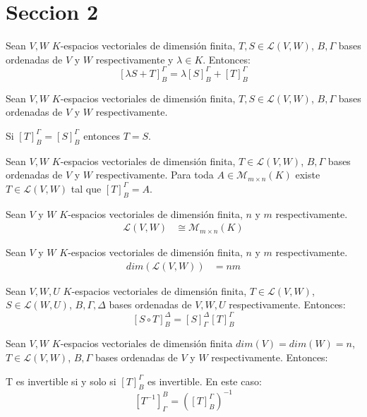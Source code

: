 \section{Seccion 2}
\begin{proposition}{}{}
    Sean $V, W$ $K$-espacios vectoriales de dimensión finita, $T, S \in \mathcal{L}(V,W)$, $B, \Gamma$ bases ordenadas de $V$ y $W$ respectivamente y $\lambda \in K$. Entonces:
    $$[\lambda S + T]_B^\Gamma = \lambda[S]_B^\Gamma + [T]_B^\Gamma$$
\end{proposition}
\begin{proposition}{}{}
    Sean $V, W$ $K$-espacios vectoriales de dimensión finita, $T, S \in \mathcal{L}(V,W)$, $B, \Gamma$ bases ordenadas de $V$ y $W$ respectivamente.

    Si $[T]_B^\Gamma = [S]_B^\Gamma$ entonces $T = S$.
\end{proposition}
\begin{proposition}{}{}
    Sean $V, W$ $K$-espacios vectoriales de dimensión finita, $T \in \mathcal{L}(V,W)$, $B, \Gamma$ bases ordenadas de $V$ y $W$ respectivamente. 
    Para toda $A \in \mathcal{M}_{m \times n}(K)$ existe $T \in \mathcal{L}(V,W)$ tal que $[T]_B^\Gamma = A$.
\end{proposition}
\begin{theorem}{}{}
    Sean $V$ y $W$ $K$-espacios vectoriales de dimensión finita, $n$ y $m$ respectivamente.
    \begin{align*}
        \mathcal{L}(V,W) &\cong \mathcal{M}_{m \times n}(K)
    \end{align*}
\end{theorem}
\begin{corollary}{}{}
    Sean $V$ y $W$ $K$-espacios vectoriales de dimensión finita, $n$ y $m$ respectivamente.
    \begin{align*}
        dim (\mathcal{L}(V, W)) &= nm
    \end{align*}
\end{corollary}
\begin{proposition}{}{}
    Sean $V, W, U$ $K$-espacios vectoriales de dimensión finita, $T \in \mathcal{L}(V,W)$, $S \in \mathcal{L}(W,U)$, $B, \Gamma, \Delta$ bases ordenadas de $V, W, U$ respectivamente. Entonces:
    $$[S \circ T]_B^\Delta = [S]_\Gamma^\Delta [T]_B^\Gamma$$
\end{proposition}
\begin{corollary}{}{}
    Sean $V, W$ $K$-espacios vectoriales de dimensión finita $dim(V) = dim(W) = n$, $T \in \mathcal{L}(V,W)$, $B, \Gamma$ bases ordenadas de $V$ y $W$ respectivamente. Entonces:

    T es invertible si y solo si $[T]_B^\Gamma$ es invertible. En este caso:
    $$[T^{-1}]_\Gamma^B = \left(\left[T\right]_B^\Gamma\right)^{-1}$$
\end{corollary}


